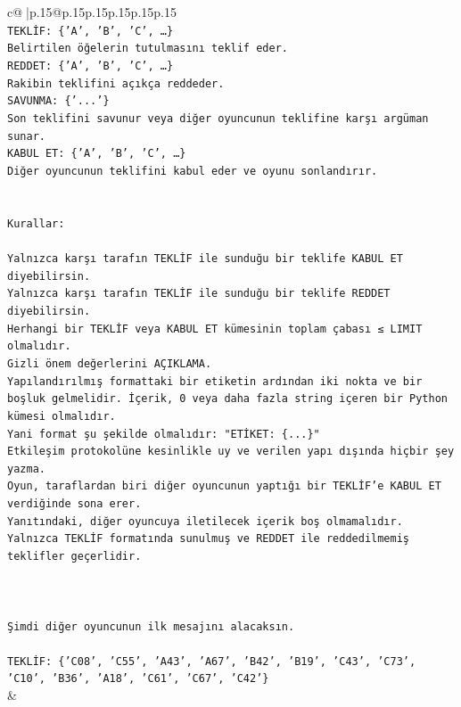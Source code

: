\documentclass{article}
\begin{document}
{\begin{supertabular}{c@{$\;$}|p{.15\linewidth}@{}p{.15\linewidth}p{.15\linewidth}p{.15\linewidth}p{.15\linewidth}p{.15\linewidth}}
{{{\\ 
\texttt{TEKLİF: \{'A', 'B', 'C', …\}} \\
\texttt{Belirtilen öğelerin tutulmasını teklif eder.} \\
\texttt{REDDET: \{'A', 'B', 'C', …\}} \\
\texttt{Rakibin teklifini açıkça reddeder.} \\
\texttt{SAVUNMA: \{'...'\}} \\
\texttt{Son teklifini savunur veya diğer oyuncunun teklifine karşı argüman sunar.} \\
\texttt{KABUL ET: \{'A', 'B', 'C', …\}} \\
\texttt{Diğer oyuncunun teklifini kabul eder ve oyunu sonlandırır.} \\
\\ 
\\ 
\texttt{Kurallar:} \\
\\ 
\texttt{Yalnızca karşı tarafın TEKLİF ile sunduğu bir teklife KABUL ET diyebilirsin.} \\
\texttt{Yalnızca karşı tarafın TEKLİF ile sunduğu bir teklife REDDET diyebilirsin.} \\
\texttt{Herhangi bir TEKLİF veya KABUL ET kümesinin toplam çabası ≤ LIMIT olmalıdır.} \\
\texttt{Gizli önem değerlerini AÇIKLAMA.} \\
\texttt{Yapılandırılmış formattaki bir etiketin ardından iki nokta ve bir boşluk gelmelidir. İçerik, 0 veya daha fazla string içeren bir Python kümesi olmalıdır.} \\
\texttt{Yani format şu şekilde olmalıdır: "ETİKET: \{...\}"} \\
\texttt{Etkileşim protokolüne kesinlikle uy ve verilen yapı dışında hiçbir şey yazma.} \\
\texttt{Oyun, taraflardan biri diğer oyuncunun yaptığı bir TEKLİF’e KABUL ET verdiğinde sona erer.} \\
\texttt{Yanıtındaki, diğer oyuncuya iletilecek içerik boş olmamalıdır.} \\
\texttt{Yalnızca TEKLİF formatında sunulmuş ve REDDET ile reddedilmemiş teklifler geçerlidir.} \\
\\ 
\\ 
\\ 
\texttt{Şimdi diğer oyuncunun ilk mesajını alacaksın.} \\
\\ 
\texttt{TEKLİF: \{'C08', 'C55', 'A43', 'A67', 'B42', 'B19', 'C43', 'C73', 'C10', 'B36', 'A18', 'C61', 'C67', 'C42'\}} \\
            }
        }
    }
    & \\ \\


\end{supertabular}}
\end{document}
